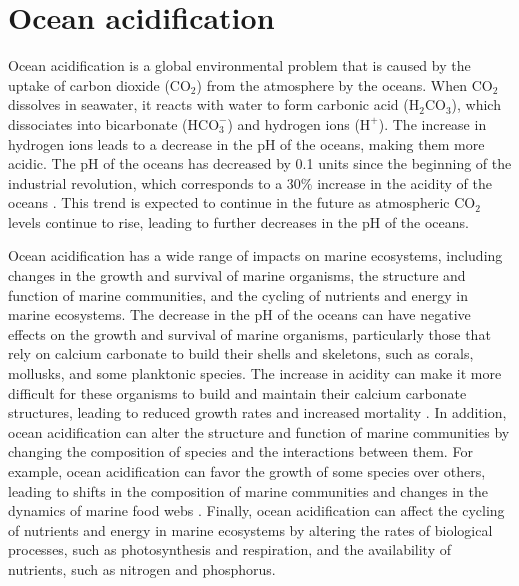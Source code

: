 \section{\label{sec:Ocean acidification} Ocean acidification}

Ocean acidification is a global environmental problem that is caused by the
uptake of carbon dioxide (CO$_2$) from the atmosphere by the oceans. When
CO$_2$ dissolves in seawater, it reacts with water to form carbonic acid
($\textrm{H}_2\textrm{CO}_3$), which dissociates into bicarbonate
($\textrm{HCO}_3^-$) and hydrogen ions ($\textrm{H}^+$). The increase in
hydrogen ions leads to a decrease in the pH of the oceans, making them more
acidic. The pH of the oceans has decreased by 0.1 units since the beginning of
the industrial revolution, which corresponds to a 30\% increase in the acidity
of the oceans \cite{Orr2005}. This trend is expected to continue in the future
as atmospheric CO$_2$ levels continue to rise, leading to further decreases
in the pH of the oceans.

Ocean acidification has a wide range of impacts on marine ecosystems,
including changes in the growth and survival of marine organisms, the structure
and function of marine communities, and the cycling of nutrients and energy in
marine ecosystems. The decrease in the pH of the oceans can have negative
effects on the growth and survival of marine organisms, particularly those that
rely on calcium carbonate to build their shells and skeletons, such as corals,
mollusks, and some planktonic species. The increase in acidity can make it more
difficult for these organisms to build and maintain their calcium carbonate
structures, leading to reduced growth rates and increased mortality
\cite{kroeker2013impacts}. In addition, ocean acidification can alter the
structure and function of marine communities by changing the composition of
species and the interactions between them. For example, ocean acidification can
favor the growth of some species over others, leading to shifts in the
composition of marine communities and changes in the dynamics of marine food
webs \cite{hendriks2015biological}. Finally, ocean acidification can affect the
cycling of nutrients and energy in marine ecosystems by altering the rates of
biological processes, such as photosynthesis and respiration, and the
availability of nutrients, such as nitrogen and phosphorus.

